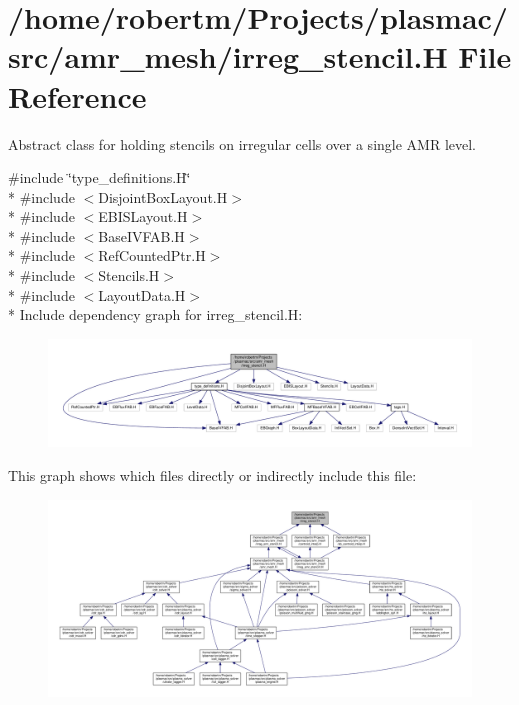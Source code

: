 \hypertarget{irreg__stencil_8H}{}\section{/home/robertm/\+Projects/plasmac/src/amr\+\_\+mesh/irreg\+\_\+stencil.H File Reference}
\label{irreg__stencil_8H}


Abstract class for holding stencils on irregular cells over a single A\+MR level.  


{\ttfamily \#include \char`\"{}type\+\_\+definitions.\+H\char`\"{}}\\*
{\ttfamily \#include $<$Disjoint\+Box\+Layout.\+H$>$}\\*
{\ttfamily \#include $<$E\+B\+I\+S\+Layout.\+H$>$}\\*
{\ttfamily \#include $<$Base\+I\+V\+F\+A\+B.\+H$>$}\\*
{\ttfamily \#include $<$Ref\+Counted\+Ptr.\+H$>$}\\*
{\ttfamily \#include $<$Stencils.\+H$>$}\\*
{\ttfamily \#include $<$Layout\+Data.\+H$>$}\\*
Include dependency graph for irreg\+\_\+stencil.\+H\+:\nopagebreak
\begin{figure}[H]
\begin{center}
\leavevmode
\includegraphics[width=350pt]{irreg__stencil_8H__incl}
\end{center}
\end{figure}
This graph shows which files directly or indirectly include this file\+:\nopagebreak
\begin{figure}[H]
\begin{center}
\leavevmode
\includegraphics[width=350pt]{irreg__stencil_8H__dep__incl}
\end{center}
\end{figure}
